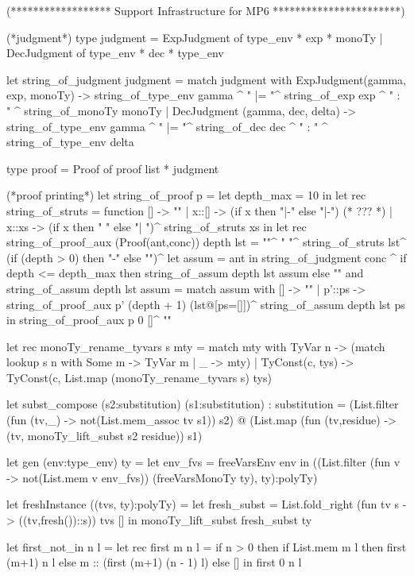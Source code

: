 (****************** Support Infrastructure for  MP6 ***********************)

(*judgment*) 
type judgment =
   ExpJudgment of type_env * exp * monoTy
 | DecJudgment of type_env * dec * type_env

let string_of_judgment judgment =
  match judgment with ExpJudgment(gamma, exp, monoTy) ->
        string_of_type_env gamma ^ " |= "^ string_of_exp exp ^
         " : " ^ string_of_monoTy monoTy
  | DecJudgment (gamma, dec, delta) ->
        string_of_type_env gamma ^ " |= "^ string_of_dec dec ^
         " : " ^ string_of_type_env delta

type proof = Proof of proof list * judgment

(*proof printing*)
let string_of_proof p =
  let depth_max = 10 in
  let rec string_of_struts = function
     []    -> ""
   | x::[] -> (if x then "|-" else "|-")  (* ??? *)
   | x::xs -> (if x then "  " else "| ")^ string_of_struts xs
  in let rec string_of_proof_aux (Proof(ant,conc)) depth lst =
    "\n"^ "  "^ string_of_struts lst^
    (if (depth > 0) then "-" else "")^
    let assum = ant in
      string_of_judgment conc ^
      if depth <= depth_max
         then string_of_assum depth lst assum
      else ""
  and string_of_assum depth lst assum =
    match assum with 
       []     -> ""
     | p'::ps -> string_of_proof_aux p' (depth + 1) (lst@[ps=[]])^
                 string_of_assum depth lst ps
  in
    string_of_proof_aux p 0 []^ "\n\n"

let rec monoTy_rename_tyvars s mty =
    match mty with
      TyVar n -> (match lookup s n with Some m -> TyVar m | _ -> mty)
    | TyConst(c, tys) -> TyConst(c, List.map (monoTy_rename_tyvars s) tys)

let subst_compose (s2:substitution) (s1:substitution) : substitution =
    (List.filter (fun (tv,_) -> not(List.mem_assoc tv s1)) s2) @ 
    (List.map (fun (tv,residue) -> (tv, monoTy_lift_subst s2 residue)) s1)

let gen (env:type_env) ty =
    let env_fvs = freeVarsEnv env in
    ((List.filter (fun v -> not(List.mem v env_fvs)) (freeVarsMonoTy ty), ty):polyTy)

let freshInstance ((tvs, ty):polyTy) =
    let fresh_subst = List.fold_right (fun tv s -> ((tv,fresh())::s)) tvs [] in
    monoTy_lift_subst fresh_subst ty

let first_not_in n l =
    let rec first m n l =
        if n > 0 then
         if List.mem m l then first (m+1) n l else m :: (first (m+1) (n - 1) l)
        else []
    in first 0 n l

